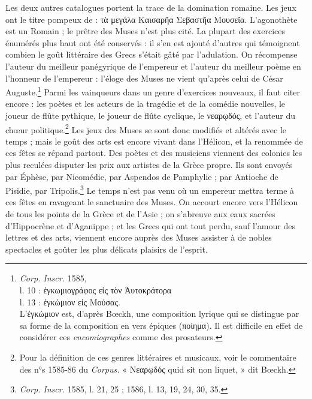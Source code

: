 \documentclass[landscape, a4paper, 11pt, oneside, polutonikogreek, french]{article}
\begin{document}
Les deux autres catalogues portent la trace de la domination romaine. Les jeux ont le titre pompeux de : τὰ μεγάλα Καισαρῆα Σεβαστῆα Μουσεῖα. L'agonothète est un Romain ; le prêtre des Muses n'est plus cité. La plupart des exercices énumérés plus haut ont été conservés : il s'en est ajouté d'autres qui témoignent combien le goût littéraire des Grecs s'était gâté par l'adulation. On récompense l'auteur du meilleur panégyrique de l'empereur et l'auteur du meilleur poème en l'honneur de l'empereur : l'éloge des Muses ne vient qu'après celui de César Auguste.\footnote{\emph{Corp. Inscr.} 1585,\\\hspace*{5mm}l. 10 : ἐγκωμιογράφος εἰς τὸν Ἀυτοκράτορα\\\hspace*{5mm}l. 13 : ἐγκώμιον εἰς Μούσας.\\\hspace*{5mm}L'ἐγκώμιον est, d'après Bœckh, une composition lyrique qui se distingue par sa forme de la composition en vers épiques (ποίημα). Il est difficile en effet de considérer ces \emph{encomiographes} comme des prosateurs.} Parmi les vainqueurs dans un genre d'exercices nouveaux, il faut citer encore : les poètes et les acteurs de la tragédie et de la comédie nouvelles, le joueur de flûte pythique, le joueur de flûte cyclique, le νεαρῳδός, et l'auteur du chœur politique.\footnote{Pour la définition de ces genres littéraires et musicaux, voir le commentaire des n°s 1585-86 du \emph{Corpus.} « Νεαρῳδός quid sit non liquet, » dit Bœckh.} Les jeux des Muses se sont donc modifiés et altérés avec le temps ; mais le goût des arts est encore vivant dans l'Hélicon, et la renommée de ces fêtes se répand partout. Des poètes et des musiciens viennent des colonies les plus reculées disputer les prix aux artistes de la Grèce propre. Ils sont envoyés par Éphèse, par Nicomédie, par Aspendos de Pamphylie ; par Antioche de Pisidie, par Tripolis.\footnote{\emph{Corp. Inscr.} 1585, l. 21, 25 ; 1586, l. 13, 19, 24, 30, 35.} Le temps n'est pas venu où un empereur mettra terme à ces fêtes en ravageant le sanctuaire des Muses. On accourt encore vers l'Hélicon de tous les points de la Grèce et de l'Asie ; on s'abreuve aux eaux sacrées d'Hippocrène et d'Aganippe ; et les Grecs qui ont tout perdu, sauf l'amour des lettres et des arts, viennent encore auprès des Muses assister à de nobles spectacles et goûter les plus délicats plaisirs de l'esprit.
\end{document}
